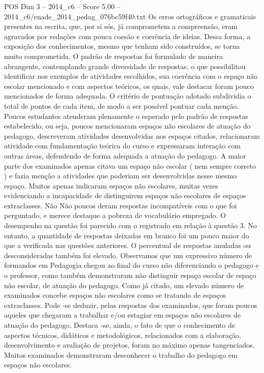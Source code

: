 \begin{textsample}{POS Dim 3 – 2014\_c6 – Score 5.00 – 2014\_c6/enade\_2014\_pedag\_076bc59f40.txt}
Os erros ortográficos e gramaticais presentes na escrita, que, por si sós, já comprometem a compreensão, eram agravados por redações com pouca coesão e coerência de ideias.
Dessa forma, a exposição dos conhecimentos, mesmo que tenham sido construídos, se torna muito comprometida.
O padrão de respostas foi formulado de maneira abrangente, contemplando grande diversidade de respostas, o que possibilitou identificar nos exemplos de atividades escolhidos, sua coerência com o espaço não escolar mencionado e com aspectos teóricos, os quais, vale destacar foram pouco mencionados de forma adequada.
O critério de pontuação adotado subdividia o total de pontos de cada item, de modo a ser possível pontuar cada menção.
Poucos estudantes atenderam plenamente o esperado pelo padrão de respostas estabelecido, ou seja, poucos mencionaram espaços não escolares de atuação do pedagogo, descreveram atividades desenvolvidas nos espaços citados, relacionaram atividade com fundamentação teórica do curso e expressaram interação com outras áreas, defendendo de forma adequada a atuação do pedagogo.
A maior parte dos examinados apenas citava um espaço não escolar ( nem sempre correto ) e fazia menção a atividades que poderiam ser desenvolvidas nesse mesmo espaço.
Muitos apenas indicaram espaços não escolares, muitas vezes evidenciando a incapacidade de distinguirem espaços não escolares de espaços extraclasses.
Não Não poucos deram respostas incompatíveis com o que foi perguntado, e merece destaque a pobreza de vocabulário empregado.
O desempenho na questão foi parecido com o registrado em relação à questão 3.
No entanto, a quantidade de respostas deixadas em branco foi um pouco maior do que a verificada nas questões anteriores.
O percentual de respostas anuladas ou desconsideradas também foi elevado.
Observamos que um expressivo número de formandos em Pedagogia chegou ao final do curso não diferenciando o pedagogo e o professor, como também demonstraram não distinguir espaço escolar de espaço não escolar, de atuação do pedagogo.
Como já citado, um elevado número de examinados concebe espaços não escolares como se tratando de espaços extraclasses.
Pode -se deduzir, pelas respostas dos examinados, que foram poucos aqueles que chegaram a trabalhar e/ou estagiar em espaços não escolares de atuação do pedagogo.
Destaca -se, ainda, o fato de que o conhecimento de aspectos técnicos, didáticos e metodológicos, relacionados com a elaboração, desenvolvimento e avaliação de projetos, foram no máximo apenas tangenciados.
Muitos examinados demonstraram desconhecer o trabalho do pedagogo em espaços não escolares.

\end{textsample}
